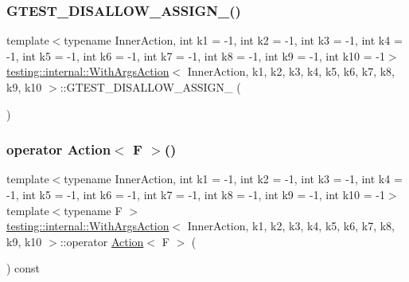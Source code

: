 \subsubsection{\texorpdfstring{G\+T\+E\+S\+T\+\_\+\+D\+I\+S\+A\+L\+L\+O\+W\+\_\+\+A\+S\+S\+I\+G\+N\+\_\+()}{GTEST\_DISALLOW\_ASSIGN\_()}}
{\footnotesize\ttfamily template$<$typename Inner\+Action, int k1 = -\/1, int k2 = -\/1, int k3 = -\/1, int k4 = -\/1, int k5 = -\/1, int k6 = -\/1, int k7 = -\/1, int k8 = -\/1, int k9 = -\/1, int k10 = -\/1$>$ \\
\hyperlink{classtesting_1_1internal_1_1WithArgsAction}{testing\+::internal\+::\+With\+Args\+Action}$<$ Inner\+Action, k1, k2, k3, k4, k5, k6, k7, k8, k9, k10 $>$\+::G\+T\+E\+S\+T\+\_\+\+D\+I\+S\+A\+L\+L\+O\+W\+\_\+\+A\+S\+S\+I\+G\+N\+\_\+ (\begin{DoxyParamCaption}\item[{\hyperlink{classtesting_1_1internal_1_1WithArgsAction}{With\+Args\+Action}$<$ Inner\+Action, k1, k2, k3, k4, k5, k6, k7, k8, k9, k10 $>$}]{ }\end{DoxyParamCaption})\hspace{0.3cm}{\ttfamily [private]}}

\mbox{\label{classtesting_1_1internal_1_1WithArgsAction_ab6d8f89fd5a54f2914da2523b2ba6ee5}} 
\subsubsection{\texorpdfstring{operator Action$<$ F $>$()}{operator Action< F >()}}
{\footnotesize\ttfamily template$<$typename Inner\+Action, int k1 = -\/1, int k2 = -\/1, int k3 = -\/1, int k4 = -\/1, int k5 = -\/1, int k6 = -\/1, int k7 = -\/1, int k8 = -\/1, int k9 = -\/1, int k10 = -\/1$>$ \\
template$<$typename F $>$ \\
\hyperlink{classtesting_1_1internal_1_1WithArgsAction}{testing\+::internal\+::\+With\+Args\+Action}$<$ Inner\+Action, k1, k2, k3, k4, k5, k6, k7, k8, k9, k10 $>$\+::operator \hyperlink{classtesting_1_1Action}{Action}$<$ F $>$ (\begin{DoxyParamCaption}{ }\end{DoxyParamCaption}) const\hspace{0.3cm}{\ttfamily [inline]}}



